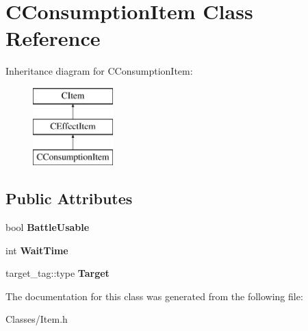 \hypertarget{class_c_consumption_item}{}\section{C\+Consumption\+Item Class Reference}
\label{class_c_consumption_item}
Inheritance diagram for C\+Consumption\+Item\+:\begin{figure}[H]
\begin{center}
\leavevmode
\includegraphics[height=3.000000cm]{class_c_consumption_item}
\end{center}
\end{figure}
\subsection*{Public Attributes}
\begin{DoxyCompactItemize}
\item 
bool {\bfseries Battle\+Usable}\hypertarget{class_c_consumption_item_a3e75872f2f45494c0582bf64f357e7ff}{}\label{class_c_consumption_item_a3e75872f2f45494c0582bf64f357e7ff}

\item 
int {\bfseries Wait\+Time}\hypertarget{class_c_consumption_item_a4904c0d42191c521ae0821d552da42c4}{}\label{class_c_consumption_item_a4904c0d42191c521ae0821d552da42c4}

\item 
target\+\_\+tag\+::type {\bfseries Target}\hypertarget{class_c_consumption_item_a9beb52aff1f3465a12218c9b965b3568}{}\label{class_c_consumption_item_a9beb52aff1f3465a12218c9b965b3568}

\end{DoxyCompactItemize}


The documentation for this class was generated from the following file\+:\begin{DoxyCompactItemize}
\item 
Classes/Item.\+h\end{DoxyCompactItemize}

